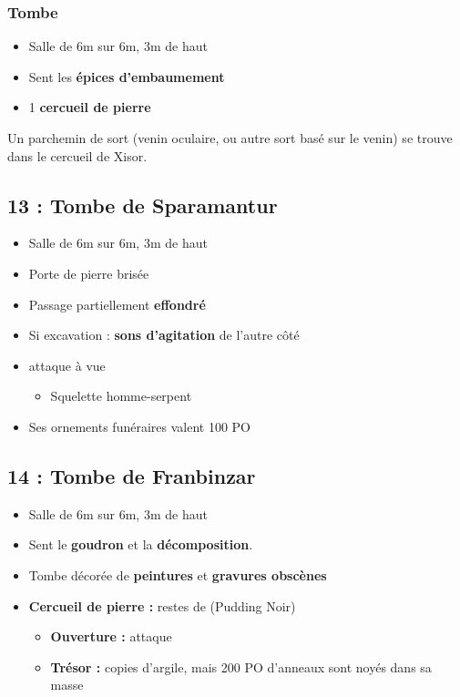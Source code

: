 \subsubsection{Tombe}
\begin{itemize}
  \item Salle de 6m sur 6m, 3m de haut
  \item Sent les \textbf{épices d’embaumement}
  \item 1 \textbf{cercueil de pierre}
\end{itemize}
Un parchemin de sort (venin oculaire, ou autre sort basé sur le venin) se trouve dans le
cercueil de Xisor.

\vfill
\pagebreak
\subsection{13 : Tombe de Sparamantur}\label{n2:s13}
\begin{itemize}
  \item Salle de 6m sur 6m, 3m de haut
  \item Porte de pierre brisée
  \item Passage partiellement \textbf{effondré}
  \item Si excavation : \textbf{sons d'agitation} de l'autre côté
  \item \textbf{} attaque à vue
  \begin{itemize}
    \item Squelette homme-serpent
  \end{itemize}
  \item Ses ornements funéraires valent 100 PO
\end{itemize}

\subsection{14 : Tombe de Franbinzar}\label{n2:s14}
\begin{itemize}
    \item Salle de 6m sur 6m, 3m de haut
    \item Sent le \textbf{goudron} et la \textbf{décomposition}.
    \item Tombe décorée de \textbf{peintures} et \textbf{gravures obscènes}
    \item \textbf{Cercueil de pierre :} restes de \textbf{} (Pudding Noir)
    \begin{itemize}
      \item \textbf{Ouverture :} attaque 
      \item \textbf{Trésor :} copies d’argile, mais 200 PO d’anneaux sont noyés dans sa masse
    \end{itemize}
\end{itemize}

